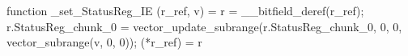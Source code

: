 function _set_StatusReg_IE (r_ref, v) = {
    r = __bitfield_deref(r_ref);
    r.StatusReg_chunk_0 = vector_update_subrange(r.StatusReg_chunk_0, 0, 0, vector_subrange(v, 0, 0));
    (*r_ref) = r
}
